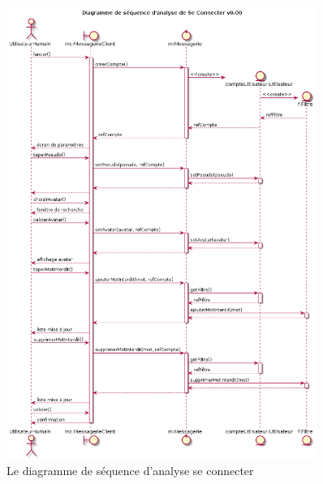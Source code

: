 \documentclass[11pt,dvipsnames,svgnames]{report}
\begin{document}
\begin{figure}[H]
\centerline{\includegraphics[width=0.9\textwidth]{diagrammes/dsa-connexion.png}}
\caption{Le diagramme de séquence d'analyse \og se connecter \fg}
\end{figure}
\end{document}
